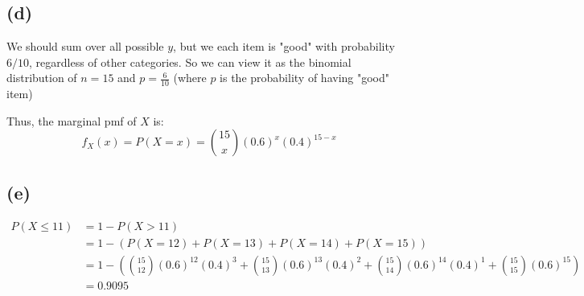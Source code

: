 \documentclass[12pt]{article}
\theoremstyle{definition}
\theoremstyle{remark}
\begin{document}
\subsection*{(d)}
We should sum over all possible $y$, but we each item is "good" with probability $6/10$, regardless of other categories. So we can view it as the binomial distribution of $n=15$ and $p=\frac{6}{10}$ (where $p$ is the probability of having "good" item)

Thus, the marginal pmf of $X$ is:
$$f_X(x)=P(X=x)=\binom{15}{x}(0.6)^x(0.4)^{15-x}$$

\subsection*{(e)}
\begin{align*}
    P(X\le 11)&=1-P(X>11) \\
    &=1-(P(X=12)+P(X=13)+P(X=14)+P(X=15)) \\
    &=1-(\binom{15}{12}(0.6)^{12}(0.4)^3+\binom{15}{13}(0.6)^{13}(0.4)^2+\binom{15}{14}(0.6)^{14}(0.4)^1+\binom{15}{15}(0.6)^{15}) \\
    &=0.9095
\end{align*}

\newpage{}
\end{document}
